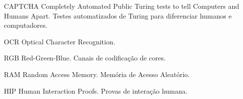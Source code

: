 \begin{siglas}
  \item[CAPTCHA] Completely Automated Public Turing tests to tell Computers and Humans Apart. Testes automatizados de Turing para diferenciar humanos e computadores.
  \item[OCR] Optical Character Recognition.
  \item[RGB] Red-Green-Blue. Canais de codificação de cores.
  \item[RAM] Random Access Memory. Memória de Acesso Aleatório.
  \item[HIP] Human Interaction Proofs. Provas de interação humana.
\end{siglas}
